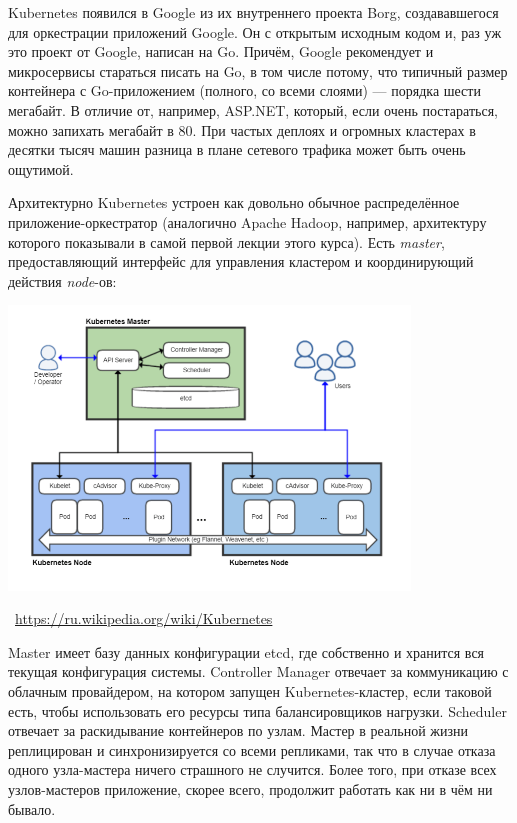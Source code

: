 \documentclass[a5paper]{article}
\newcommand{\attribution}[1] {
    \vspace{-5mm}\begin{flushright}\begin{scriptsize}\textcolor{gray}{\textcopyright\, #1}\end{scriptsize}\end{flushright}
}
\begin{document}
Kubernetes появился в Google из их внутреннего проекта Borg, создававшегося для оркестрации приложений Google. Он с открытым исходным кодом и, раз уж это проект от Google, написан на Go. Причём, Google рекомендует и микросервисы стараться писать на Go, в том числе потому, что типичный размер контейнера с Go-приложением (полного, со всеми слоями) --- порядка шести мегабайт. В отличие от, например, ASP.NET, который, если очень постараться, можно запихать мегабайт в 80. При частых деплоях и огромных кластерах в десятки тысяч машин разница в плане сетевого трафика может быть очень ощутимой.

Архитектурно Kubernetes устроен как довольно обычное распределённое приложение-оркестратор (аналогично Apache Hadoop, например, архитектуру которого показывали в самой первой лекции этого курса). Есть \emph{master}, предоставляющий интерфейс для управления кластером и координирующий действия \emph{node}-ов:

\begin{center}
    \includegraphics[width=0.8\textwidth]{kubernetesArchitecture.png}
    \attribution{\url{https://ru.wikipedia.org/wiki/Kubernetes}}
\end{center}

Master имеет базу данных конфигурации etcd, где собственно и хранится вся текущая конфигурация системы. Controller Manager отвечает за коммуникацию с облачным провайдером, на котором запущен Kubernetes-кластер, если таковой есть, чтобы использовать его ресурсы типа балансировщиков нагрузки. Scheduler отвечает за раскидывание контейнеров по узлам. Мастер в реальной жизни реплицирован и синхронизируется со всеми репликами, так что в случае отказа одного узла-мастера ничего страшного не случится. Более того, при отказе всех узлов-мастеров приложение, скорее всего, продолжит работать как ни в чём ни бывало.
\end{document}
